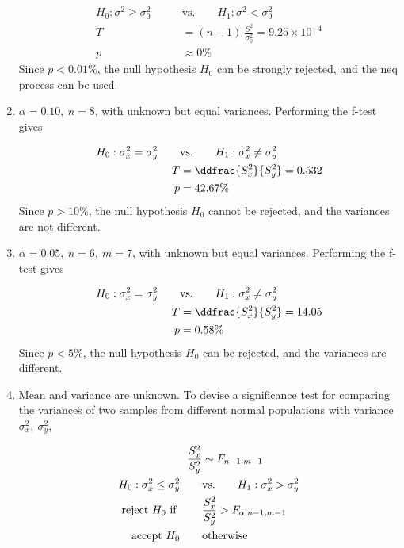 \begin{enumerate}
	\begin{align}
		H_0 : \sigma^2 \geq \sigma_0^2 \qquad &\text{vs.} \qquad H_1 : \sigma^2 < \sigma_0^2 \nonumber \\
		T &= (n-1)\ \frac{S^2}{\sigma_0^2} = 9.25\times 10^{-4}\nonumber \\
		p &\approx 0\% 
	\end{align}
	Since $ p < 0.01\% $, the null hypothesis $ H_0 $ can be strongly rejected, and the neq process can be used.

	\item $\alpha = 0.10,\ n = 8$, with unknown but equal variances. Performing the f-test gives
	
	\begin{align}
		H_0 : \sigma^2_x = \sigma^2_y \qquad &\text{vs.} \qquad H_1 : \sigma^2_x \neq \sigma^2_y \nonumber \\
		T &= \ddfrac{ S^2_x }{S^2_y} = 0.532 \nonumber \\
		p &= 42.67\% 
	\end{align}
	Since $ p > 10\% $, the null hypothesis $ H_0 $ cannot be rejected, and the variances are not different.
	
	\item $\alpha = 0.05,\ n = 6,\ m = 7$, with unknown but equal variances. Performing the f-test gives
	
	\begin{align}
		H_0 : \sigma^2_x = \sigma^2_y \qquad &\text{vs.} \qquad H_1 : \sigma^2_x \neq \sigma^2_y \nonumber \\
		T &= \ddfrac{ S^2_x }{S^2_y} = 14.05 \nonumber \\
		p &= 0.58\% 
	\end{align}
	Since $ p < 5\% $, the null hypothesis $ H_0 $ can be rejected, and the variances are different.
	
	\item Mean and variance are unknown. To devise a significance test for comparing the variances of two samples from different normal populations with variance $ \sigma^2_x,\ \sigma^2_y $,
	
	\begin{align}
		\frac{S^2_x}{S^2_y} &\sim F_{n-1, m-1} \nonumber \\
		H_0 : \sigma_x^2 \leq \sigma_y^2 \qquad &\text{vs.} \qquad H_1 : \sigma_x^2 > \sigma_y^2 \nonumber \\
		\text{reject $ H_0 $ if } \qquad & \frac{S^2_x}{S^2_y} >  F_{\alpha, n-1, m-1} \nonumber \\
		\text{accept $ H_0 $} \qquad & \text{otherwise}
	\end{align}


\end{enumerate}
